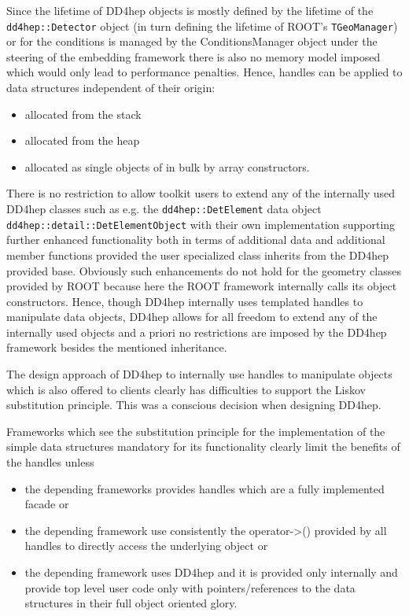 Since the lifetime of DD4hep objects is mostly defined by the lifetime of the {\texttt{dd4hep::Detector}} object (in turn defining the lifetime of ROOT's {\texttt{TGeoManager}}) or for the conditions is managed by the ConditionsManager object under the steering of the embedding framework there is also no memory model imposed which would only lead to performance penalties. Hence, handles can be applied to data structures independent of their origin:
\begin{itemize}
\item allocated from the stack
\item allocated from the heap
\item allocated as single objects of in bulk by array constructors.
\end{itemize}

There is no restriction to allow toolkit users to extend any of the internally used DD4hep classes such as e.g. the {\texttt{dd4hep::DetElement}} data object {\texttt{dd4hep::detail::DetElementObject}} with their own implementation supporting further enhanced functionality both in terms of additional data and additional member functions provided the user specialized class inherits from the DD4hep provided base. Obviously such enhancements do not hold for the geometry classes provided by ROOT because here the ROOT framework internally calls its object constructors. Hence, though DD4hep internally uses templated handles to manipulate data objects, DD4hep allows for all freedom to extend any of the internally used objects and a priori no restrictions are imposed by the DD4hep framework besides the mentioned inheritance.

The design approach of DD4hep to internally use handles to manipulate objects which is also offered to clients clearly has difficulties to support the Liskov substitution principle. This was a conscious decision when designing DD4hep.

Frameworks which see the substitution principle for the implementation of the simple data structures mandatory for its functionality clearly limit the  benefits of the handles unless

\begin{itemize}
\item the depending frameworks provides handles which are a fully implemented facade or
\item the depending framework use consistently the operator->() provided by all   handles to directly access the underlying object or
\item the depending framework uses DD4hep and it is provided only internally and provide top level user code only with pointers/references to the data structures in their full object oriented glory.
\end{itemize}

